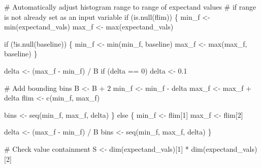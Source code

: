\documentclass[
  letterpaper,
  DIV=11,
  numbers=noendperiod]{scrartcl}
\newenvironment{Shaded}{\begin{snugshade}}{\end{snugshade}}
\newcommand{\BuiltInTok}[1]{\textcolor[rgb]{0.00,0.23,0.31}{#1}}
\newcommand{\CommentTok}[1]{\textcolor[rgb]{0.37,0.37,0.37}{#1}}
\newcommand{\ControlFlowTok}[1]{\textcolor[rgb]{0.00,0.23,0.31}{#1}}
\newcommand{\DecValTok}[1]{\textcolor[rgb]{0.68,0.00,0.00}{#1}}
\newcommand{\FloatTok}[1]{\textcolor[rgb]{0.68,0.00,0.00}{#1}}
\newcommand{\KeywordTok}[1]{\textcolor[rgb]{0.00,0.23,0.31}{#1}}
\newcommand{\NormalTok}[1]{\textcolor[rgb]{0.00,0.23,0.31}{#1}}
\newcommand{\OperatorTok}[1]{\textcolor[rgb]{0.37,0.37,0.37}{#1}}
\begin{document}
\begin{Shaded}
\begin{Highlighting}[]
  \CommentTok{\# Automatically adjust histogram range to range of expectand values}
  \CommentTok{\# if range is not already set as an input variable}
  \ControlFlowTok{if}\NormalTok{ (}\KeywordTok{is}\NormalTok{.null(flim)) \{}
\NormalTok{    min\_f }\OperatorTok{\textless{}{-}} \BuiltInTok{min}\NormalTok{(expectand\_vals)}
\NormalTok{    max\_f }\OperatorTok{\textless{}{-}} \BuiltInTok{max}\NormalTok{(expectand\_vals)}

    \ControlFlowTok{if}\NormalTok{ (}\OperatorTok{!}\KeywordTok{is}\NormalTok{.null(baseline)) \{}
\NormalTok{      min\_f }\OperatorTok{\textless{}{-}} \BuiltInTok{min}\NormalTok{(min\_f, baseline)}
\NormalTok{      max\_f }\OperatorTok{\textless{}{-}} \BuiltInTok{max}\NormalTok{(max\_f, baseline)}
\NormalTok{    \}}

\NormalTok{    delta }\OperatorTok{\textless{}{-}}\NormalTok{ (max\_f }\OperatorTok{{-}}\NormalTok{ min\_f) }\OperatorTok{/}\NormalTok{ B}
    \ControlFlowTok{if}\NormalTok{ (delta }\OperatorTok{==} \DecValTok{0}\NormalTok{)}
\NormalTok{      delta }\OperatorTok{\textless{}{-}} \FloatTok{0.1}

    \CommentTok{\# Add bounding bins}
\NormalTok{    B }\OperatorTok{\textless{}{-}}\NormalTok{ B }\OperatorTok{+} \DecValTok{2}
\NormalTok{    min\_f }\OperatorTok{\textless{}{-}}\NormalTok{ min\_f }\OperatorTok{{-}}\NormalTok{ delta}
\NormalTok{    max\_f }\OperatorTok{\textless{}{-}}\NormalTok{ max\_f }\OperatorTok{+}\NormalTok{ delta}
\NormalTok{    flim }\OperatorTok{\textless{}{-}}\NormalTok{ c(min\_f, max\_f)}

\NormalTok{    bins }\OperatorTok{\textless{}{-}}\NormalTok{ seq(min\_f, max\_f, delta)}
\NormalTok{  \} }\ControlFlowTok{else}\NormalTok{ \{}
\NormalTok{    min\_f }\OperatorTok{\textless{}{-}}\NormalTok{ flim[}\DecValTok{1}\NormalTok{]}
\NormalTok{    max\_f }\OperatorTok{\textless{}{-}}\NormalTok{ flim[}\DecValTok{2}\NormalTok{]}

\NormalTok{    delta }\OperatorTok{\textless{}{-}}\NormalTok{ (max\_f }\OperatorTok{{-}}\NormalTok{ min\_f) }\OperatorTok{/}\NormalTok{ B}
\NormalTok{    bins }\OperatorTok{\textless{}{-}}\NormalTok{ seq(min\_f, max\_f, delta)}
\NormalTok{  \}}

  \CommentTok{\# Check value containment}
\NormalTok{  S }\OperatorTok{\textless{}{-}}\NormalTok{ dim(expectand\_vals)[}\DecValTok{1}\NormalTok{] }\OperatorTok{*}\NormalTok{ dim(expectand\_vals)[}\DecValTok{2}\NormalTok{]}


\end{Highlighting}
\end{Shaded}
\end{document}

